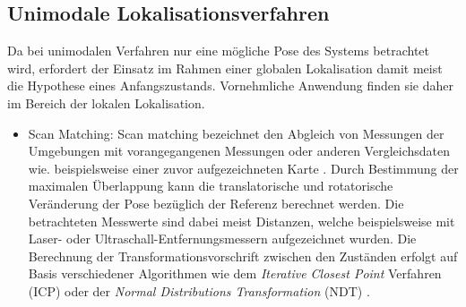 \subsection{Unimodale Lokalisationsverfahren}
Da bei unimodalen Verfahren nur eine mögliche Pose des Systems betrachtet wird, erfordert der Einsatz im Rahmen einer globalen Lokalisation damit meist die \red[(sinnvolle)] Hypothese eines Anfangszustands. Vornehmliche Anwendung finden sie daher im Bereich der lokalen Lokalisation. 

\begin{itemize}

\item Scan Matching: Scan matching bezeichnet den Abgleich von Messungen der Umgebungen mit vorangegangenen Messungen \cite{Gutmann1996} oder anderen Vergleichsdaten wie. beispielsweise einer zuvor aufgezeichneten Karte \cite{Gutmann1998}. Durch Bestimmung der maximalen Überlappung kann die translatorische und rotatorische Veränderung der Pose bezüglich der Referenz berechnet werden. Die betrachteten Messwerte sind dabei meist Distanzen, welche beispielsweise mit Laser- \cite{Diosi2007} oder Ultraschall-Entfernungsmessern \cite{Burguera2005} aufgezeichnet wurden. Die Berechnung der Transformationsvorschrift zwischen den Zuständen erfolgt auf Basis verschiedener Algorithmen wie dem \textit{Iterative Closest Point} Verfahren (ICP) \cite{Besl1992}\cite{Lu1994} oder der \textit{Normal Distributions Transformation} (NDT) \cite{Biber2003}.


\end{itemize}
